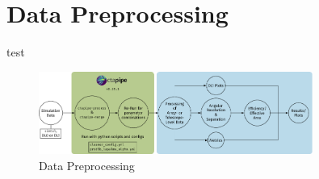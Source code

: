 \chapter{Data Preprocessing}
\label{ch:data-preprocessing}
test \cite{ma-sebastian}

\begin{figure}
    \centering
    \includegraphics[width=0.8\textwidth]{graphics/data_pipeline.pdf}
    \caption{Data Preprocessing}
    \label{fig:data-preprocessing}
\end{figure}